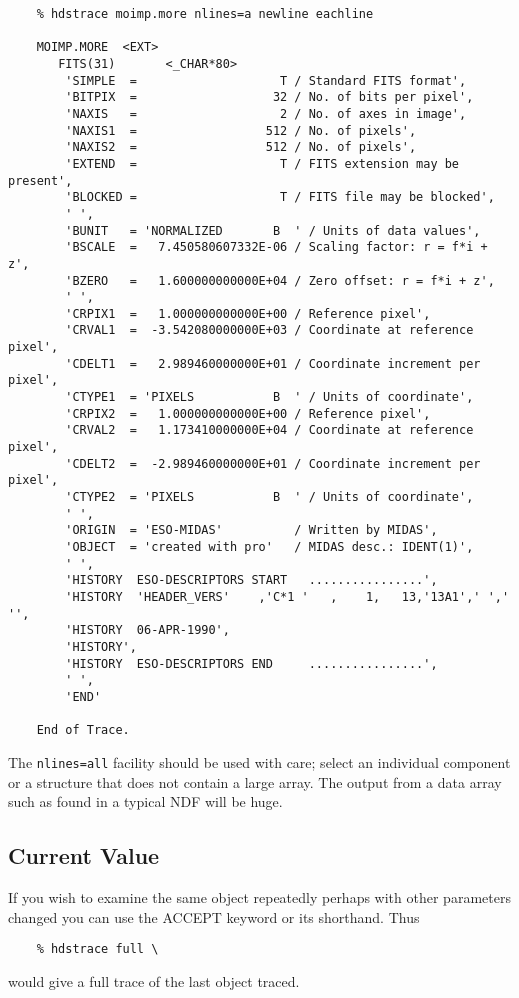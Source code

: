 \small
\begin{verbatim}
    % hdstrace moimp.more nlines=a newline eachline

    MOIMP.MORE  <EXT>
       FITS(31)       <_CHAR*80>      
        'SIMPLE  =                    T / Standard FITS format',
        'BITPIX  =                   32 / No. of bits per pixel',
        'NAXIS   =                    2 / No. of axes in image',
        'NAXIS1  =                  512 / No. of pixels',
        'NAXIS2  =                  512 / No. of pixels',
        'EXTEND  =                    T / FITS extension may be present',
        'BLOCKED =                    T / FITS file may be blocked',
        ' ',
        'BUNIT   = 'NORMALIZED       B  ' / Units of data values',
        'BSCALE  =   7.450580607332E-06 / Scaling factor: r = f*i + z',
        'BZERO   =   1.600000000000E+04 / Zero offset: r = f*i + z',
        ' ',
        'CRPIX1  =   1.000000000000E+00 / Reference pixel',
        'CRVAL1  =  -3.542080000000E+03 / Coordinate at reference pixel',
        'CDELT1  =   2.989460000000E+01 / Coordinate increment per pixel',
        'CTYPE1  = 'PIXELS           B  ' / Units of coordinate',
        'CRPIX2  =   1.000000000000E+00 / Reference pixel',
        'CRVAL2  =   1.173410000000E+04 / Coordinate at reference pixel',
        'CDELT2  =  -2.989460000000E+01 / Coordinate increment per pixel',
        'CTYPE2  = 'PIXELS           B  ' / Units of coordinate',
        ' ',
        'ORIGIN  = 'ESO-MIDAS'          / Written by MIDAS',
        'OBJECT  = 'created with pro'   / MIDAS desc.: IDENT(1)',
        ' ',
        'HISTORY  ESO-DESCRIPTORS START   ................',
        'HISTORY  'HEADER_VERS'    ,'C*1 '   ,    1,   13,'13A1',' ',' '',
        'HISTORY  06-APR-1990',
        'HISTORY',
        'HISTORY  ESO-DESCRIPTORS END     ................',
        ' ',
        'END'

    End of Trace.
\end{verbatim}
\normalsize
The {\tt nlines=all} facility should be used with care; select an individual
component or a structure that does not contain a large array.  The 
output from a data array such as found in a typical NDF will be huge.

\subsection{Current Value}

If you wish to examine the same object repeatedly perhaps with other
parameters changed you can use the ACCEPT keyword or its shorthand.
Thus
\small
\begin{verbatim}
    % hdstrace full \
\end{verbatim}
\normalsize
would give a full trace of the last object traced.

